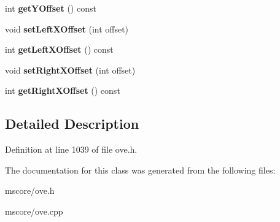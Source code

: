 \begin{DoxyCompactItemize}
int {\bfseries get\+Y\+Offset} () const
\item 
\mbox{\label{class_o_v_e_1_1_line_a637300e30dc9fcae924d73022598c896}} 
void {\bfseries set\+Left\+X\+Offset} (int offset)
\item 
\mbox{\label{class_o_v_e_1_1_line_a5dd880076164d0fc86b684a2c1ea517c}} 
int {\bfseries get\+Left\+X\+Offset} () const
\item 
\mbox{\label{class_o_v_e_1_1_line_a427b01eb0f70f1722e17aa3ebd9b1733}} 
void {\bfseries set\+Right\+X\+Offset} (int offset)
\item 
\mbox{\label{class_o_v_e_1_1_line_a32a64cd079a72a7158f84e16461261ed}} 
int {\bfseries get\+Right\+X\+Offset} () const
\end{DoxyCompactItemize}


\subsection{Detailed Description}


Definition at line 1039 of file ove.\+h.



The documentation for this class was generated from the following files\+:\begin{DoxyCompactItemize}
\item 
mscore/ove.\+h\item 
mscore/ove.\+cpp\end{DoxyCompactItemize}
